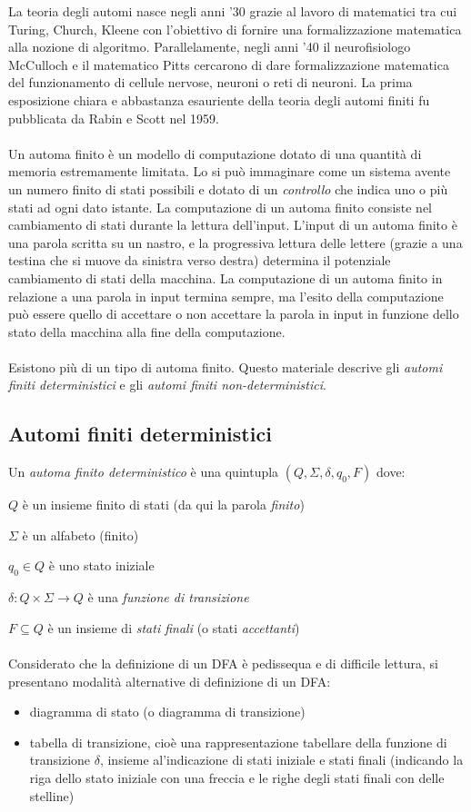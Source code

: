 \documentclass[]{article}
\begin{document}
La teoria degli automi nasce negli anni '30 grazie al lavoro di matematici tra cui Turing, Church, Kleene
con l'obiettivo di fornire una formalizzazione matematica alla nozione di algoritmo. Parallelamente, negli
anni '40 il neurofisiologo McCulloch e il matematico Pitts cercarono di dare formalizzazione matematica del
funzionamento di cellule nervose, neuroni o reti di neuroni. La prima esposizione chiara e abbastanza
esauriente della teoria degli automi finiti fu pubblicata da Rabin e Scott nel 1959.
\\
\\
Un automa finito è un modello di computazione dotato di una quantità di memoria estremamente limitata. Lo
si può immaginare come un sistema avente un numero finito di stati possibili e dotato di un \textit{controllo}
che indica uno o più stati ad ogni dato istante. La computazione di un automa finito consiste nel cambiamento
di stati durante la lettura dell'input. L'input di un automa finito è una parola scritta su un nastro, e la
progressiva lettura delle lettere (grazie a una testina che si muove da sinistra verso destra) determina il
potenziale cambiamento di stati della macchina. La computazione di un automa finito in relazione a una
parola in input termina sempre, ma l'esito della computazione può essere quello di accettare o non accettare
la parola in input in funzione dello stato della macchina alla fine della computazione.
\\
\\
Esistono più di un tipo di automa finito. Questo materiale descrive gli \textit{automi finiti deterministici}
e gli \textit{automi finiti non-deterministici}.


\subsection{Automi finiti deterministici}
Un \textit{automa finito deterministico} è una quintupla \mbox{$(Q, \Sigma, \delta, q_0, F)$} dove:

\mbox{$Q$} è un insieme finito di stati (da qui la parola \textit{finito})

\mbox{$\Sigma$} è un alfabeto (finito)

\mbox{$q_0 \in Q$} è uno stato iniziale

\mbox{$\delta \colon Q \times \Sigma \to Q$} è una \textit{funzione di transizione}

\mbox{$F \subseteq Q$} è un insieme di \textit{stati finali} (o stati \textit{accettanti})
\\
\\
Considerato che la definizione di un DFA è pedissequa e di difficile lettura, si presentano modalità alternative di definizione di un DFA:
\begin{itemize}
    \item diagramma di stato (o diagramma di transizione)
    \item tabella di transizione, cioè una rappresentazione tabellare della funzione di transizione \mbox{$\delta$}, insieme al'indicazione di stati iniziale e stati finali (indicando la riga dello stato iniziale con una freccia e le righe degli stati finali con delle stelline)
\end{itemize}
\end{document}
